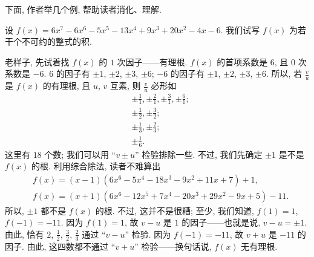 下面, 作者举几个例, 帮助读者消化、理解.

\begin{example}
    设 $f(x) = 6 x^7-6 x^6-5 x^5-13 x^4+9 x^3+20 x^2-4 x-6$. 我们试写 $f(x)$ 为若干个不可约的整式的积.

    老样子, 先试着找 $f(x)$ 的 $1$ 次因子——有理根. $f(x)$ 的首项系数是 $6$, 且 $0$ 次系数是 $-6$. $6$ 的因子有 $\pm 1$, $\pm 2$, $\pm 3$, $\pm 6$; $-6$ 的因子有 $\pm 1$, $\pm 2$, $\pm 3$, $\pm 6$. 所以, 若 $\frac{v}{u}$ 是 $f(x)$ 的有理根, 且 $u$, $v$ 互素, 则 $\frac{v}{u}$ 必形如
    \begin{align*}
         & {\pm \frac{1}{1}}, {\pm \frac{2}{1}}, {\pm \frac{3}{1}}, {\pm \frac{6}{1}}; \\
         & {\pm \frac{1}{2}}, {\pm \frac{3}{2}};                                       \\
         & {\pm \frac{1}{3}}, {\pm \frac{2}{3}};                                       \\
         & {\pm \frac{1}{6}}.
    \end{align*}
    这里有 $18$ 个数; 我们可以用 ``$v \pm u$'' 检验排除一些. 不过, 我们先确定 $\pm 1$ 是不是 $f(x)$ 的根. 利用综合除法, 读者不难算出
    \begin{align*}
         & f(x) = (x-1) (6 x^6-5 x^4-18 x^3-9 x^2+11 x+7) + 1,         \\
         & f(x) = (x+1) (6 x^6-12 x^5+7 x^4-20 x^3+29 x^2-9 x+5) - 11.
    \end{align*}
    所以, $\pm 1$ 都不是 $f(x)$ 的根. 不过, 这并不是很糟; 至少, 我们知道, $f(1) = 1$, $f(-1) = -11$. 因为 $f(1) = 1$, 故 $v - u$ 是 $1$ 的因子——也就是说, $v - u = \pm 1$. 由此, 恰有 $2$, $\frac{1}{2}$, $\frac{3}{2}$, $\frac{2}{3}$ 通过 ``$v - u$'' 检验. 因为 $f(-1) = -11$, 故 $v + u$ 是 $-11$ 的因子. 由此, 这四数都不通过 ``$v + u$'' 检验——换句话说, $f(x)$ 无有理根.


\end{example}
